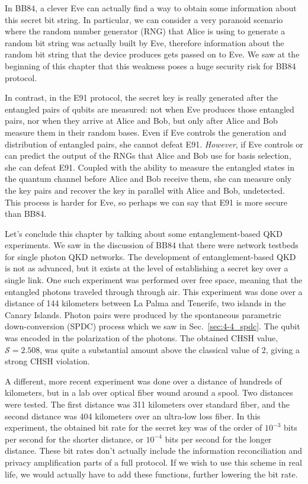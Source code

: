 In BB84, a clever Eve can actually find a way to obtain some information about this secret bit string. In particular, we can consider a very paranoid scenario where the random number generator (RNG) that Alice is using to generate a random bit string was actually built by Eve, therefore information about the random bit string that the device produces gets passed on to Eve. We saw at the beginning of this chapter that this weakness poses a huge security risk for BB84 protocol.

In contrast, in the E91 protocol, the secret key is really generated after the entangled pairs of qubits are measured: not when Eve produces those entangled pairs, nor when they arrive at Alice and Bob, but only after Alice and Bob measure them in their random bases. Even if Eve controls the generation and distribution of entangled pairs, she cannot defeat E91. \emph{However}, if Eve controls or can predict the output of the RNGs that Alice and Bob use for basis selection, she can defeat E91. Coupled with the ability to measure the entangled states in the quantum channel before Alice and Bob receive them, she can measure only the key pairs and recover the key in parallel with Alice and Bob, undetected. This process is harder for Eve, so perhaps we can say that E91 is more secure than BB84.

Let's conclude this chapter by talking about some entanglement-based QKD experiments. We saw in the discussion of BB84 that there were network testbeds for single photon QKD networks. The development of entanglement-based QKD is not as advanced, but it exists at the level of establishing a secret key over a single link. One such experiment was performed over free space, meaning that the entangled photons traveled through through air.  This experiment was done over a distance of 144 kilometers between La Palma and Tenerife, two islands in the Canary Islands. Photon pairs were produced by the spontaneous parametric down-conversion (SPDC) process which we saw in Sec.~\ref{sec:4-4_spdc}. The qubit was encoded in the polarization of the photons. The obtained CHSH value, $\mathcal{S} =2.508$, was quite a substantial amount above the classical value of 2, giving a strong CHSH violation.

A different, more recent experiment was done over a distance of hundreds of kilometers, but in a lab over optical fiber wound around a spool.  Two distances were tested. The  first distance was 311 kilometers over standard fiber, and the second distance was 404 kilometers over an ultra-low loss fiber.  In this experiment, the obtained bit rate for the secret key was of the order of $10^{-3}$ bits per second for the shorter distance, or $10^{-4}$ bits per second for the longer distance. These bit rates don't actually include the information reconciliation and privacy amplification parts of a full protocol. If we wish to use this scheme in real life, we would actually have to add these functions, further lowering the bit rate.

